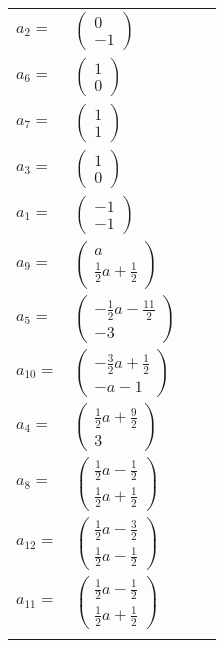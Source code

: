 \documentclass[1p]{elsarticle_modified}
\theoremstyle{definition}
\begin{document}
\begin{tabular}{m{7pt} m{180pt} m{7pt} m{180pt} }
\flushright $a_{2}=$&$\begin{pmatrix}0\\-1\end{pmatrix}$ \\
\flushright $a_{6}=$&$\begin{pmatrix}1\\0\end{pmatrix}$ \\
\flushright $a_{7}=$&$\begin{pmatrix}1\\1\end{pmatrix}$ \\
\flushright $a_{3}=$&$\begin{pmatrix}1\\0\end{pmatrix}$ \\
\flushright $a_{1}=$&$\begin{pmatrix}-1\\-1\end{pmatrix}$ \\
\flushright $a_{9}=$&$\begin{pmatrix}a\\\frac{1}{2} a+\frac{1}{2}\end{pmatrix}$ \\
\flushright $a_{5}=$&$\begin{pmatrix}-\frac{1}{2} a-\frac{11}{2}\\-3\end{pmatrix}$ \\
\flushright $a_{10}=$&$\begin{pmatrix}-\frac{3}{2} a+\frac{1}{2}\\- a-1\end{pmatrix}$ \\
\flushright $a_{4}=$&$\begin{pmatrix}\frac{1}{2} a+\frac{9}{2}\\3\end{pmatrix}$ \\
\flushright $a_{8}=$&$\begin{pmatrix}\frac{1}{2} a-\frac{1}{2}\\\frac{1}{2} a+\frac{1}{2}\end{pmatrix}$ \\
\flushright $a_{12}=$&$\begin{pmatrix}\frac{1}{2} a-\frac{3}{2}\\\frac{1}{2} a-\frac{1}{2}\end{pmatrix}$ \\
\flushright $a_{11}=$&$\begin{pmatrix}\frac{1}{2} a-\frac{1}{2}\\\frac{1}{2} a+\frac{1}{2}\end{pmatrix}$\\&\end{tabular}
\end{document}
